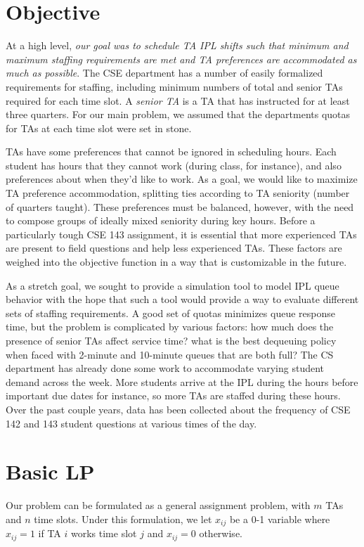\documentclass{article}
\begin{document}
\begin{multicols}{2}
\section*{Objective}

At a high level, \textit{our goal was to schedule TA IPL shifts such that minimum and maximum staffing requirements are met and TA preferences are accommodated as much as possible}. The CSE department has a number of easily formalized requirements for staffing, including minimum numbers of total and senior TAs required for each time slot. A \textit{senior TA} is a TA that has instructed for at least three quarters. For our main problem, we assumed that the departments quotas for TAs at each time slot were set in stone.

TAs have some preferences that cannot be ignored in scheduling hours. Each student has hours that they cannot work (during class, for instance), and also preferences about when they'd like to work. As a goal, we would like to maximize TA preference accommodation, splitting ties according to TA seniority (number of quarters taught). These preferences must be balanced, however, with the need to compose groups of ideally mixed seniority during key hours. Before a particularly tough CSE 143 assignment, it is essential that more experienced TAs are present to field questions and help less experienced TAs. These factors are weighed into the objective function in a way that is customizable in the future.

As a stretch goal, we sought to provide a simulation tool to model IPL queue behavior with the hope that such a tool would provide a way to evaluate different sets of staffing requirements. A good set of quotas minimizes queue response time, but the problem is complicated by various factors: how much does the presence of senior TAs affect service time? what is the best dequeuing policy when faced with 2-minute and 10-minute queues that are both full? The CS department has already done some work to accommodate varying student demand across the week. More students arrive at the IPL during the hours before important due dates for instance, so more TAs are staffed during these hours. Over the past couple years, data has been collected about the frequency of CSE 142 and 143 student questions at various times of the day.

\section*{Basic LP}
Our problem can be formulated as a general assignment problem, with $m$ TAs and $n$ time slots. Under this formulation, we let $x_{ij}$ be a 0-1 variable where $x_{ij} = 1$ if TA $i$ works time slot $j$ and $x_{ij} = 0$ otherwise.


\end{multicols}
\end{document}
